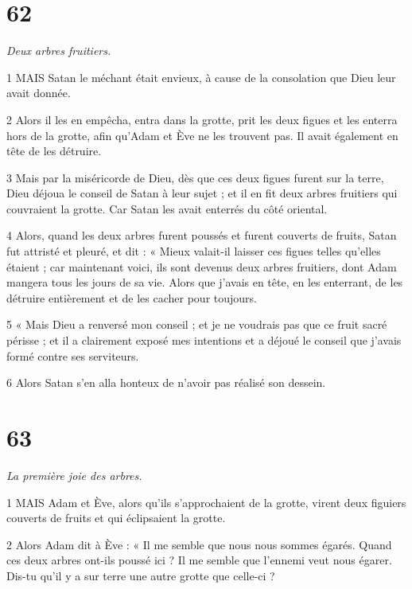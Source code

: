 \chapter{62}

\par \textit{Deux arbres fruitiers.}

\par 1 MAIS Satan le méchant était envieux, à cause de la consolation que Dieu leur avait donnée.

\par 2 Alors il les en empêcha, entra dans la grotte, prit les deux figues et les enterra hors de la grotte, afin qu'Adam et Ève ne les trouvent pas. Il avait également en tête de les détruire.

\par 3 Mais par la miséricorde de Dieu, dès que ces deux figues furent sur la terre, Dieu déjoua le conseil de Satan à leur sujet ; et il en fit deux arbres fruitiers qui couvraient la grotte. Car Satan les avait enterrés du côté oriental.

\par 4 Alors, quand les deux arbres furent poussés et furent couverts de fruits, Satan fut attristé et pleuré, et dit : « Mieux valait-il laisser ces figues telles qu'elles étaient ; car maintenant voici, ils sont devenus deux arbres fruitiers, dont Adam mangera tous les jours de sa vie. Alors que j’avais en tête, en les enterrant, de les détruire entièrement et de les cacher pour toujours.

\par 5 « Mais Dieu a renversé mon conseil ; et je ne voudrais pas que ce fruit sacré périsse ; et il a clairement exposé mes intentions et a déjoué le conseil que j'avais formé contre ses serviteurs.

\par 6 Alors Satan s'en alla honteux de n'avoir pas réalisé son dessein.

\chapter{63}

\par \textit{La première joie des arbres.}

\par 1 MAIS Adam et Ève, alors qu'ils s'approchaient de la grotte, virent deux figuiers couverts de fruits et qui éclipsaient la grotte.

\par 2 Alors Adam dit à Ève : « Il me semble que nous nous sommes égarés. Quand ces deux arbres ont-ils poussé ici ? Il me semble que l’ennemi veut nous égarer. Dis-tu qu’il y a sur terre une autre grotte que celle-ci ?

